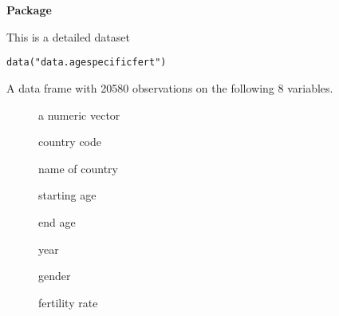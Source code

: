 \documentclass[a4paper]{book}
\begin{document}
\chapter*{}
\begin{center}
{\textbf{\huge Package}}
\par\bigskip{\large \today}
\end{center}
\begin{description}
\raggedright{}
\item[Type]
\item[Title]
\item[Version]
\item[Author]
\item[Maintainer]\AsIs{}
\item[Description]
\item[License]
\item[Encoding]
\item[LazyData]
\end{description}
%
\begin{Description}\relax
This is a detailed dataset
\end{Description}
%
\begin{Usage}
\begin{verbatim}
data("data.agespecificfert")
\end{verbatim}
\end{Usage}
%
\begin{Format}
A data frame with 20580 observations on the following 8 variables.
\begin{description}

\item[] a numeric vector
\item[] country code
\item[] name of country
\item[] starting age
\item[] end age
\item[] year
\item[] gender
\item[] fertility rate

\end{description}

\end{Format}
\end{document}
